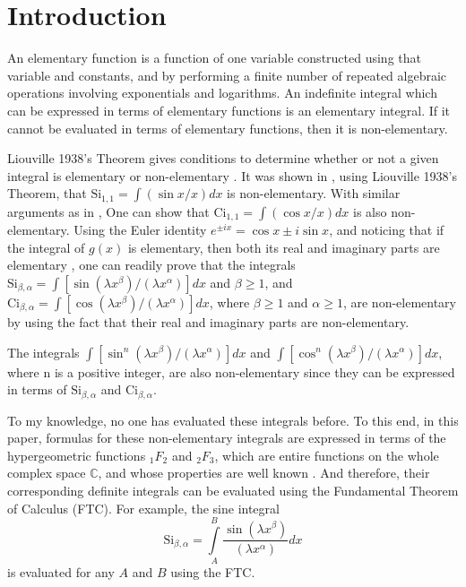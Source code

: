 \documentclass[smallextended]{svjour3}
\begin{document}
\section{Introduction}\label{intro}
\begin{definition}
An elementary function is a function of one variable constructed using that variable and constants, and by performing a finite number of repeated algebraic operations involving exponentials and logarithms.
An indefinite integral which can be expressed in terms of elementary functions is an elementary integral. If it cannot be evaluated in terms of elementary functions, then it is non-elementary\cite{MZ,R}.
\label{defn1}
\end{definition}
Liouville 1938's Theorem gives conditions to determine whether or not a given integral is elementary or non-elementary \cite{MZ,R}. It was shown in \cite {MZ,R}, using  Liouville 1938's Theorem, that $\text{Si}_{1,1}=\int (\sin{x}/x) dx$ is non-elementary. With similar arguments as in \cite {MZ,R}, One can show that $\text{Ci}_{1,1}=\int (\cos{x}/x) dx$ is also non-elementary. Using the Euler identity $e^{\pm ix}=\cos{x}\pm i\sin{x}$, and noticing that if the integral of $g(x)$ is elementary, then both its real and imaginary parts are elementary \cite{MZ}, one can readily prove that the integrals $\text{Si}_{\beta,\alpha}=\int [\sin{(\lambda x^\beta)}/(\lambda x^\alpha)] dx$ and $\beta\ge1$, and $\text{Ci}_{\beta,\alpha}=\int [\cos{(\lambda x^\beta)}/(\lambda x^\alpha)] dx$, where $\beta\ge1$ and $\alpha\ge1$, are non-elementary by using the fact that their real and imaginary parts are non-elementary.

The integrals $\int [\sin^n{(\lambda x^\beta)}/(\lambda x^\alpha)] dx$ and $\int [\cos^n{(\lambda x^\beta)}/(\lambda x^\alpha)] dx$, where n is a positive integer, are also non-elementary since they can be expressed in terms of $\text{Si}_{\beta,\alpha}$ and $\text{Ci}_{\beta,\alpha}$.

To my knowledge, no one has evaluated these integrals before. To this end, in this paper, formulas for these non-elementary integrals are expressed in terms of the hypergeometric functions  $_{1}F_2$ and $_{2}F_3$, which are entire functions on the whole complex space $\mathbb{C}$, and whose properties are well known \cite{K,ND}. And therefore, their corresponding definite integrals can be evaluated using the Fundamental Theorem of Calculus (FTC). For example, the sine integral
\begin{equation}
\text{Si}_{\beta,\alpha}=\int\limits_{A}^{B} \frac{\sin {(\lambda x^\beta)}}{(\lambda x^\alpha)} dx
\end{equation}
is evaluated for any $A$ and $B$ using the FTC.
\end{document}

